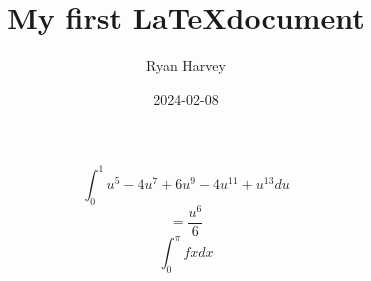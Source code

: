 \documentclass{article}
\begin{document}
\title{My first \LaTeX document}
\author{Ryan Harvey}
\date{2024-02-08}
\maketitle
\newpage
$$\int_0^1u^5-4u^7+6u^9-4u^{11}+u^{13}du$$
$$= \frac{u^6}{6}$$
$$\int_0^{\pi}fxdx$$
\end{document}
